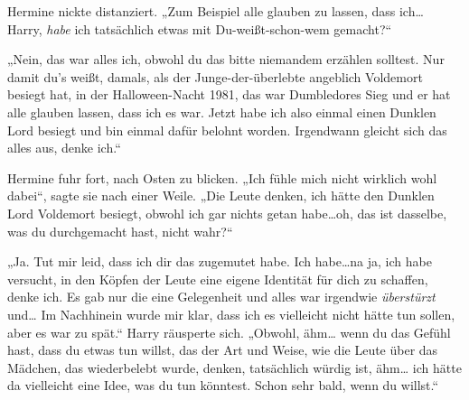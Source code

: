 Hermine nickte distanziert. „Zum Beispiel alle glauben zu lassen, dass ich… Harry, \emph{habe} ich tatsächlich etwas mit Du-weißt-schon-wem gemacht?“

„Nein, das war alles ich, obwohl du das bitte niemandem erzählen solltest. Nur damit du’s weißt, damals, als der Junge-der-überlebte angeblich Voldemort besiegt hat, in der Halloween-Nacht 1981, das war Dumbledores Sieg und er hat alle glauben lassen, dass ich es war. Jetzt habe ich also einmal einen Dunklen Lord besiegt und bin einmal dafür belohnt worden. Irgendwann gleicht sich das alles aus, denke ich.“

Hermine fuhr fort, nach Osten zu blicken.
„Ich fühle mich nicht wirklich wohl dabei“, sagte sie nach einer Weile. „Die Leute denken, ich hätte den Dunklen Lord Voldemort besiegt, obwohl ich gar nichts getan habe…oh, das ist dasselbe, was du durchgemacht hast, nicht wahr?“

„Ja. Tut mir leid, dass ich dir das zugemutet habe. Ich habe…na ja, ich habe versucht, in den Köpfen der Leute eine eigene Identität für dich zu schaffen, denke ich. Es gab nur die eine Gelegenheit und alles war irgendwie \emph{überstürzt} und… Im Nachhinein wurde mir klar, dass ich es vielleicht nicht hätte tun sollen, aber es war zu spät.“ Harry räusperte sich. „Obwohl, ähm… wenn du das Gefühl hast, dass du etwas tun willst, das der Art und Weise, wie die Leute über das Mädchen, das wiederbelebt wurde, denken, tatsächlich würdig ist, ähm… ich hätte da vielleicht eine Idee, was du tun könntest. Schon sehr bald, wenn du willst.“

